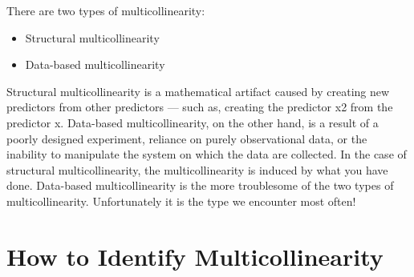 \documentclass[a4paper,12pt]{article}
\begin{document}
	There are two types of multicollinearity: 
	\begin{itemize}
		\item Structural multicollinearity
		\item Data-based multicollinearity
	\end{itemize}
	Structural multicollinearity is a mathematical artifact caused by creating new predictors from other predictors — such as, creating the predictor x2 from the predictor x. 
	Data-based multicollinearity, on the other hand, is a result of a poorly designed experiment, reliance on purely observational data, or the inability to manipulate the system on which the data are collected. 
	In the case of structural multicollinearity, the multicollinearity is induced by what you have done. Data-based multicollinearity is the more troublesome of the two types of multicollinearity. Unfortunately it is the type we encounter most often!
	
	


\section{How to Identify Multicollinearity}
\end{document}
